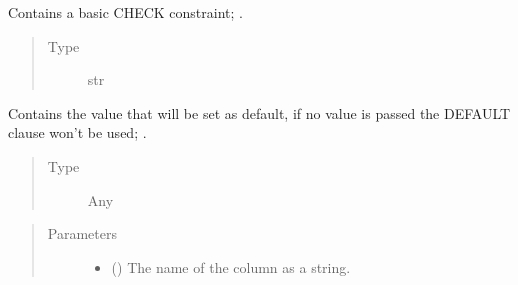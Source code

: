 \documentclass[letterpaper,10pt,english]{sphinxmanual}
\begin{document}
\begin{fulllineitems}
\begin{fulllineitems}
\begin{quote}
\begin{description}
\end{description}\end{quote}

\end{fulllineitems}


\begin{fulllineitems}
\label{\detokenize{model:mini_sql.model.column.Column.__constraint}}
\sphinxAtStartPar
Contains a basic CHECK constraint; .
\begin{quote}\begin{description}
\item[{Type}] \leavevmode
\sphinxAtStartPar
str

\end{description}\end{quote}

\end{fulllineitems}


\begin{fulllineitems}
\label{\detokenize{model:mini_sql.model.column.Column.__default}}
\sphinxAtStartPar
Contains the value that will be set as default, if no value
is passed the DEFAULT clause won’t be used; .
\begin{quote}\begin{description}
\item[{Type}] \leavevmode
\sphinxAtStartPar
Any

\end{description}\end{quote}

\end{fulllineitems}

\begin{quote}\begin{description}
\item[{Parameters}] \leavevmode\begin{itemize}
\item {} 
\sphinxAtStartPar
{} () \textendash{} The name of the column as a string.


\end{itemize}
\end{description}
\end{quote}
\end{fulllineitems}
\end{document}
